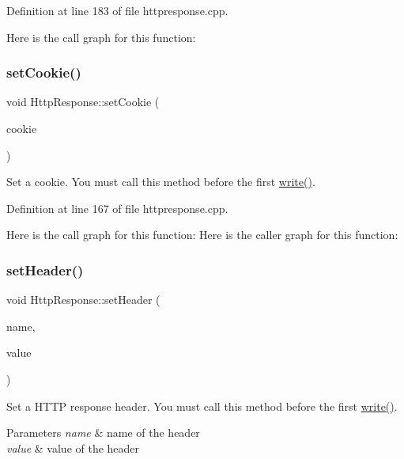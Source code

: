 Definition at line 183 of file httpresponse.\+cpp.

Here is the call graph for this function\+:
\mbox{\label{classstefanfrings_1_1_http_response_ac32c7fcc332d3f834ec88ae06b2e7d63}} 
\subsubsection{\texorpdfstring{set\+Cookie()}{setCookie()}}
{\footnotesize\ttfamily void Http\+Response\+::set\+Cookie (\begin{DoxyParamCaption}\item[{const \mbox{\hyperlink{classstefanfrings_1_1_http_cookie}{Http\+Cookie}} \&}]{cookie }\end{DoxyParamCaption})}

Set a cookie. You must call this method before the first \mbox{\hyperlink{classstefanfrings_1_1_http_response_a6e49919cc568835ca6d81fec02533260}{write()}}. 

Definition at line 167 of file httpresponse.\+cpp.

Here is the call graph for this function\+:
Here is the caller graph for this function\+:
\mbox{\label{classstefanfrings_1_1_http_response_a41029ee24e05e419e6da7ea970bc3724}} 
\subsubsection{\texorpdfstring{set\+Header()}{setHeader()}\hspace{0.1cm}{\footnotesize\ttfamily [1/2]}}
{\footnotesize\ttfamily void Http\+Response\+::set\+Header (\begin{DoxyParamCaption}\item[{Q\+Byte\+Array}]{name,  }\item[{Q\+Byte\+Array}]{value }\end{DoxyParamCaption})}

Set a H\+T\+TP response header. You must call this method before the first \mbox{\hyperlink{classstefanfrings_1_1_http_response_a6e49919cc568835ca6d81fec02533260}{write()}}. 
\begin{DoxyParams}{Parameters}
{\em name} & name of the header \\
\hline
{\em value} & value of the header \\
\hline
\end{DoxyParams}


